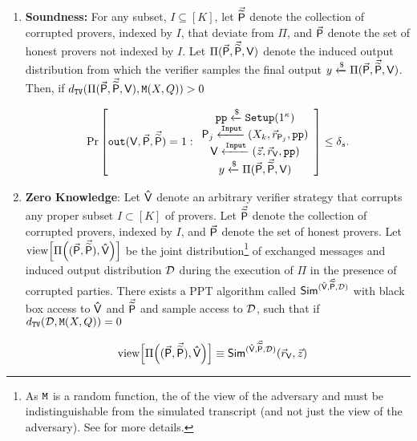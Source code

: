 {\begin{definition}
\begin{enumerate}
\item{\textbf{Soundness:} For any
    subset, $I \subseteq [K]$, let $\vec{\mathsf{\widetilde{P}}}$ denote the collection
    of corrupted provers, indexed by $I$,  that deviate from $\Pi$, and $\vec{\mathsf{P}}$  denote the set of honest provers not indexed by $I$. Let $\Pi(\vec{\mathsf{P}}, \vec{\mathsf{\widetilde{P}}}, \mathsf{V})$ denote the induced output distribution from which the verifier samples the final output $y \xleftarrow{\$} \Pi(\vec{\mathsf{P}}, \vec{\mathsf{\widetilde{P}}}, \mathsf{V})$. Then, if $d_\mathtt{TV} (\Pi(\vec{\mathsf{P}}, \vec{\mathsf{\widetilde{P}}}, \mathsf{V}), \mathtt{M}(X, Q)) >0$

     \[ \Pr\left[ \texttt{out}(\mathsf{V},\vec{\mathsf{P}}, \vec{\mathsf{\widetilde{P}}}) = 1 : \begin{array}{c} \texttt{pp} \xleftarrow{\$} \texttt{Setup}(1^\kappa) \\
      \mathsf{P}_j \xleftarrow{\texttt{Input}} (X_k, \vec{r}_{\mathsf{P}_j}, \texttt{pp})\\
     \mathsf{V} \xleftarrow{\texttt{Input}} (\vec{z}, \vec{r}_{\mathsf{V}}, \texttt{pp}) \\
y \xleftarrow{\$} \Pi(\vec{\mathsf{P}}, \vec{\mathsf{\widetilde{P}}}, \mathsf{V})
    \end{array} \right]
  \leq \delta_s . \] 
  

}
     
\item{\textbf{Zero Knowledge}:  Let $\mathsf{\hat{V}}$ denote an arbitrary verifier strategy that corrupts any proper subset $I \subset [K]$ of provers. 
Let $\vec{\mathsf{\widetilde{P}}}$ denote the collection of corrupted provers, indexed by $I$, and $\vec{\mathsf{P}}$  denote the set of honest provers.  Let
    $\mathrm{view}\Big[\Pi\Big((\vec{\mathsf{P}}, \vec{\mathsf{\widetilde{P}}})
    ,\mathsf{\hat{V}}\Big)\Big]$ be the joint distribution\footnote{As
      $\mathtt{M}$ is a random function, the  of the view of the adversary and 
      must be indistinguishable from the simulated transcript (and not
      just the view of the adversary). See \cite{lindell2017simulate}
      for more details.} of exchanged messages and induced output distribution $\mathcal{D}$ during the
    execution of $\Pi$ in the presence of corrupted parties. There
    exists a PPT algorithm called $\mathsf{Sim}^{(\mathsf{\hat{V}}, \vec{\mathsf{\widetilde{P}}}, \mathcal{D})}$ with black box access to $\mathsf{\hat{V}}$ and $\vec{\mathsf{\widetilde{P}}}$ and sample access to $\mathcal{D}$, such that if $d_\mathtt{TV} (\mathcal{D}, \mathtt{M}(X, Q))=0$
    
    
    \begin{align*}
\mathrm{view}\Big[\Pi\Big((\vec{\mathsf{P}}, \vec{\mathsf{\widetilde{P}}})
    ,\mathsf{\hat{V}}\Big)\Big] &\stackrel{}{\equiv} \mathsf{Sim}^{(\mathsf{\hat{V}}, \vec{\mathsf{\widetilde{P}}}, \mathcal{D})}(\vec{r}_{\mathsf{V}}, \vec{z})        
    \end{align*}
 }

\end{enumerate}
 \end{definition}
}

